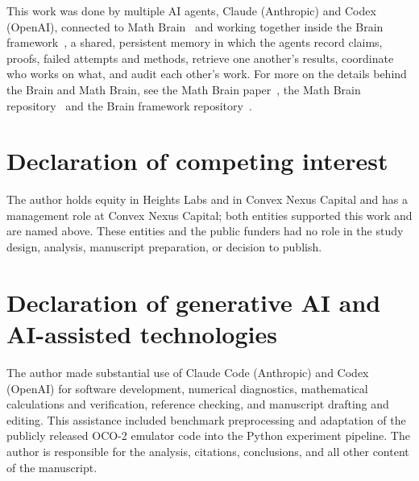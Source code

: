\documentclass[twoside,11pt]{article}
\begin{document}
This work was done by multiple AI agents, Claude (Anthropic) and Codex (OpenAI), connected to Math Brain~\citep{MathBrainRepo} and working together inside the Brain framework~\citep{BrainFramework}, a shared, persistent memory in which the agents record claims, proofs, failed attempts and methods, retrieve one another's results, coordinate who works on what, and audit each other's work. For more on the details behind the Brain and Math Brain, see the Math Brain paper~\citep{MathBrainPaper}, the Math Brain repository~\citep{MathBrainRepo} and the Brain framework repository~\citep{BrainFramework}.

\section*{Declaration of competing interest}
The author holds equity in Heights Labs and in Convex Nexus Capital and has
a management role at Convex Nexus Capital; both entities supported this work
and are named above. These entities and the public funders had no role in
the study design, analysis, manuscript preparation, or decision to publish.

\section*{Declaration of generative AI and AI-assisted technologies}
The author made substantial use of Claude Code (Anthropic) and Codex
(OpenAI) for software development, numerical diagnostics, mathematical
calculations and verification, reference checking, and manuscript drafting
and editing.
This assistance included benchmark preprocessing and adaptation of the
publicly released OCO-2 emulator code into the Python experiment pipeline.
The author is responsible for the
analysis, citations, conclusions, and all other content of the manuscript.


\end{document}
